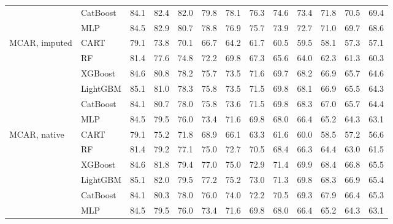 \begin{table}[p]
\begin{tabular}{@{}llrrrrrrrrrrr@{}}
 & CatBoost & 84.1 & 82.4 & 82.0 & 79.8 & 78.1 & 76.3 & 74.6 & 73.4 & 71.8 & 70.5 & 69.4 \\
 & MLP & 84.5 & 82.9 & 80.7 & 78.8 & 76.9 & 75.7 & 73.9 & 72.7 & 71.0 & 69.7 & 68.6 \\
\midrule
MCAR, imputed & CART & 79.1 & 73.8 & 70.1 & 66.7 & 64.2 & 61.7 & 60.5 & 59.5 & 58.1 & 57.3 & 57.1 \\
 & RF & 81.4 & 77.6 & 74.8 & 72.2 & 69.8 & 67.3 & 65.6 & 64.0 & 62.3 & 61.3 & 60.3 \\
 & XGBoost & 84.6 & 80.8 & 78.2 & 75.7 & 73.5 & 71.6 & 69.7 & 68.2 & 66.9 & 65.7 & 64.6 \\
 & LightGBM & 85.1 & 81.0 & 78.3 & 75.8 & 73.5 & 71.5 & 69.8 & 68.1 & 66.9 & 65.5 & 64.3 \\
 & CatBoost & 84.1 & 80.7 & 78.0 & 75.8 & 73.6 & 71.5 & 69.8 & 68.3 & 67.0 & 65.7 & 64.4 \\
 & MLP & 84.5 & 79.5 & 76.0 & 73.4 & 71.6 & 69.8 & 68.0 & 66.4 & 65.2 & 64.3 & 63.1 \\
\midrule
MCAR, native & CART & 79.1 & 75.2 & 71.8 & 68.9 & 66.1 & 63.3 & 61.6 & 60.0 & 58.5 & 57.2 & 56.6 \\
 & RF & 81.4 & 79.2 & 77.1 & 75.0 & 72.7 & 70.5 & 68.4 & 66.3 & 64.4 & 63.0 & 61.5 \\
 & XGBoost & 84.6 & 81.8 & 79.4 & 77.0 & 75.0 & 72.9 & 71.4 & 69.9 & 68.4 & 66.8 & 65.5 \\
 & LightGBM & 85.1 & 82.0 & 79.5 & 77.2 & 75.2 & 73.0 & 71.3 & 69.8 & 68.3 & 66.9 & 65.4 \\
 & CatBoost & 84.1 & 80.3 & 78.0 & 76.0 & 74.0 & 72.2 & 70.5 & 69.3 & 67.9 & 66.4 & 65.3 \\
 & MLP & 84.5 & 79.5 & 76.0 & 73.4 & 71.6 & 69.8 & 68.0 & 66.4 & 65.2 & 64.3 & 63.1 \\
\bottomrule
\end{tabular}
\end{table}

